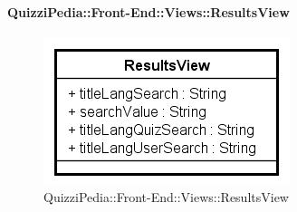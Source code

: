 \paragraph{QuizziPedia::Front-End::Views::ResultsView}

\label{QuizziPedia::Front-End::View::ResultView}
\begin{figure} [ht]
	\centering
	\includegraphics[scale=0.80]{UML/Classi/Front-End/QuizziPedia_Front-end_Views_ResultsView.png}
	\caption{QuizziPedia::Front-End::Views::ResultsView}
\end{figure} \FloatBarrier
